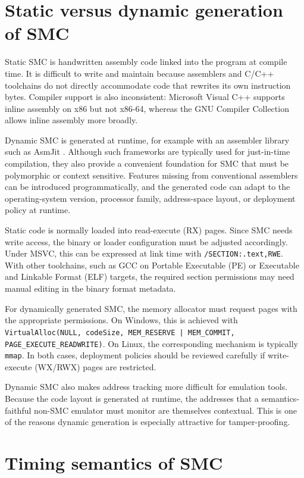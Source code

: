 \documentclass[11pt]{article}
\begin{document}
\section{Static versus dynamic generation of SMC}\label{sec:static-dynamic}

Static SMC is handwritten assembly code linked into the program at compile time.
It is difficult to write and maintain because assemblers and C/C++ toolchains do
not directly accommodate code that rewrites its own instruction bytes.  Compiler
support is also inconsistent: Microsoft Visual C++ supports inline assembly on
x86 but not x86-64, whereas the GNU Compiler Collection allows inline assembly
more broadly.

Dynamic SMC is generated at runtime, for example with an assembler library such
as AsmJit \cite{asmjitAsmJit}.  Although such frameworks are typically used for
just-in-time compilation, they also provide a convenient foundation for SMC that
must be polymorphic or context sensitive.  Features missing from conventional
assemblers can be introduced programmatically, and the generated code can adapt
to the operating-system version, processor family, address-space layout, or
deployment policy at runtime.

Static code is normally loaded into read-execute (RX) pages.  Since SMC needs
write access, the binary or loader configuration must be adjusted accordingly.
Under MSVC, this can be expressed at link time with
\lstinline|/SECTION:.text,RWE|.  With other toolchains, such as GCC on Portable
Executable (PE) or Executable and Linkable Format (ELF) targets, the required
section permissions may need manual editing in the binary format metadata.

For dynamically generated SMC, the memory allocator must request pages with the
appropriate permissions.  On Windows, this is achieved with
\lstinline!VirtualAlloc(NULL, codeSize, MEM_RESERVE | MEM_COMMIT, PAGE_EXECUTE_READWRITE)!.
On Linux, the corresponding mechanism is typically \lstinline|mmap|.  In both
cases, deployment policies should be reviewed carefully if write-execute (WX/RWX)
pages are restricted.

Dynamic SMC also makes address tracking more difficult for emulation tools.
Because the code layout is generated at runtime, the addresses that a semantics-
faithful non-SMC emulator must monitor are themselves contextual.  This is one of
the reasons dynamic generation is especially attractive for tamper-proofing.

\section{Timing semantics of SMC}\label{sec:timing-semantics}
\end{document}
